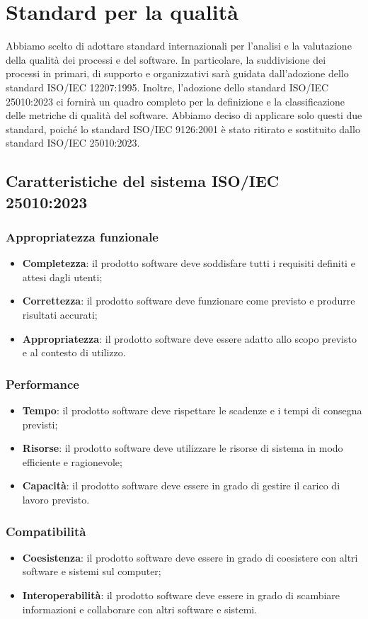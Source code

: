 \section{Standard per la qualità}
Abbiamo scelto di adottare standard internazionali per l'analisi e la valutazione della qualità dei processi e del software. In particolare, la suddivisione dei processi in primari, di supporto e organizzativi sarà guidata dall'adozione dello standard ISO/IEC 12207:1995. Inoltre, l'adozione dello standard ISO/IEC 25010:2023 ci fornirà un quadro completo per la definizione e la classificazione delle metriche di qualità del software. Abbiamo deciso di applicare solo questi due standard, poiché lo standard ISO/IEC 9126:2001 è stato ritirato e sostituito dallo standard ISO/IEC 25010:2023.
\subsection{Caratteristiche del sistema ISO/IEC 25010:2023}
\subsubsection{Appropriatezza funzionale}
\begin{itemize}
    \item \textbf{Completezza}: il prodotto software deve soddisfare tutti i requisiti definiti e attesi dagli utenti;
    \item \textbf{Correttezza}: il prodotto software deve funzionare come previsto e produrre risultati accurati;
    \item \textbf{Appropriatezza}: il prodotto software deve essere adatto allo scopo previsto e al contesto di utilizzo.
\end{itemize}
\subsubsection{Performance}
\begin{itemize}
    \item \textbf{Tempo}: il prodotto software deve rispettare le scadenze e i tempi di consegna previsti;
    \item \textbf{Risorse}: il prodotto software deve utilizzare le risorse di sistema in modo efficiente e ragionevole;
    \item \textbf{Capacità}: il prodotto software deve essere in grado di gestire il carico di lavoro previsto.
\end{itemize}
\subsubsection{Compatibilità}
\begin{itemize}
    \item \textbf{Coesistenza}: il prodotto software deve essere in grado di coesistere con altri software e sistemi sul computer;
    \item \textbf{Interoperabilità}: il prodotto software deve essere in grado di scambiare informazioni e collaborare con altri software e sistemi.
\end{itemize}
